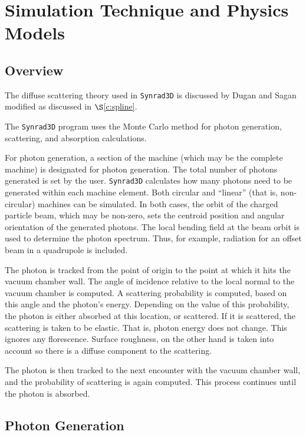\documentclass[11pt,openany]{report}
\newcommand{\sref}[1]{$\S$\ref{#1}}
\newcommand{\srthree}{\texttt{Synrad3D}\xspace}
\begin{document}
\chapter{Simulation Technique and Physics Models}
\section{Overview} 

The diffuse scattering theory used in \srthree is discussed by 
Dugan and Sagan\cite{b:prab} modified as discussed in \sref{c:spline}.

The \srthree program uses the Monte Carlo method for photon
generation, scattering, and absorption calculations.

For photon generation, a section of the machine (which may be the
complete machine) is designated for photon generation.  The total
number of photons generated is set by the user. \srthree calculates
how many photons need to be generated within each machine
element. Both circular and ``linear'' (that is, non-circular) machines
can be simulated.  In both cases, the orbit of the charged particle
beam, which may be non-zero, sets the centroid position and angular
orientation of the generated photons. The local bending field at the
beam orbit is used to determine the photon spectrum. Thus, for
example, radiation for an offset beam in a quadrupole is included.

The photon is tracked from the point of origin to
the point at which it hits the vacuum chamber wall. The angle of
incidence relative to the local normal to the vacuum chamber is
computed. A scattering probability is computed, based on this angle
and the photon's energy. Depending on the value of this probability,
the photon is either absorbed at this location, or scattered. If it is
scattered, the scattering is taken to be elastic. That is, photon
energy does not change. This ignores any florescence. Surface
roughness, on the other hand is taken into account so there is a
diffuse component to the scattering.

The photon is then tracked to the next encounter with the vacuum
chamber wall, and the probability of scattering is again
computed. This process continues until the photon is absorbed.

\section{Photon Generation}
\end{document}
